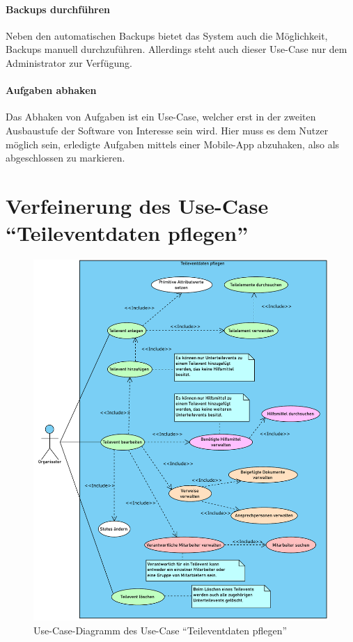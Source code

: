 \paragraph{Backups durchführen}
Neben den automatischen Backups bietet das System auch die Möglichkeit, Backups manuell durchzuführen. Allerdings steht auch dieser Use-Case nur dem Administrator zur Verfügung.

\paragraph{Aufgaben abhaken}
Das Abhaken von Aufgaben ist ein Use-Case, welcher erst in der zweiten Ausbaustufe der Software von Interesse sein wird. Hier muss es dem Nutzer möglich sein, erledigte Aufgaben mittels einer Mobile-App abzuhaken, also als abgeschlossen zu markieren.

\section{Verfeinerung des Use-Case \enquote{Teileventdaten pflegen}}
\begin{figure}[ht!]
    \centering
    \includegraphics[width=0.98\columnwidth]{Bilder/use-case-diagramm-fein.pdf}
    \caption{Use-Case-Diagramm des Use-Case \enquote{Teileventdaten pflegen}}
    \label{fig:uc:fein}
\end{figure}

